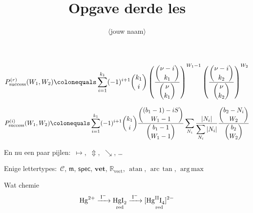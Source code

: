 \documentclass[a4paper]{article}
\title{Opgave derde les}
\author{$\langle$jouw naam$\rangle$}
\DeclareMathOperator*\argmax{arg\,max}
\begin{document}
\maketitle


\begin{equation}
  \label{eq:p_suc_r_W}
	P_{\text{success}}^{(r)}(W_1, W_2) \colonequals \sum_{i=1}^{k_1} (-1)^{i+1} \dbinom{k_1}{i} \left(\frac{\dbinom{\nu-i}{k_1}}{\dbinom{\nu}{k_1}}\right)^{W_1-1}\left(\frac{\dbinom{\nu-i}{k_2}}{\dbinom{\nu}{k_2}}\right)^{W_2}
\end{equation}

\begin{equation}
	\label{eq:p_suc_bibd_W_weighted}
	P_{\text{success}}^{(i)}(W_1, W_2) \colonequals \sum_{i=1}^{k_1} (-1)^{i+1} \dbinom{k_1}{i} \frac{\dbinom{(b_1-1)-iS}{W_1-1}}{\dbinom{b_1-1}{W_1-1}}	\sum_{N_i}\frac{|N_i|}{\displaystyle\sum_{N_i}|N_i|}\frac{\dbinom{b_2-N_i}{W_2}}{\dbinom{b_2}{W_2}}
\end{equation}

En nu een paar pijlen:~$\longmapsto$,~$\Updownarrow$,~$\searrow$, \ldots

Enige lettertypes:~$\mathcal{C}$, $\mathfrak{m}$, $\mathsf{spec}$, $\textbf{vet}$, $\mathbb{R}_{\textrm{vect}}$, $\operatorname{atan}$, $\operatorname{arc\:\!tan}$, $\argmax$

Wat chemie
\begin{equation}
  \ce{Hg^2+ ->[\ce{I-}]
  $\underset{\mathrm{red}}{\ce{HgI2}}$
  ->C[I-]
  $\underset{\mathrm{red}}{\ce{[Hg^{II}I4]^2-}}$
  }
\end{equation}
\end{document}
